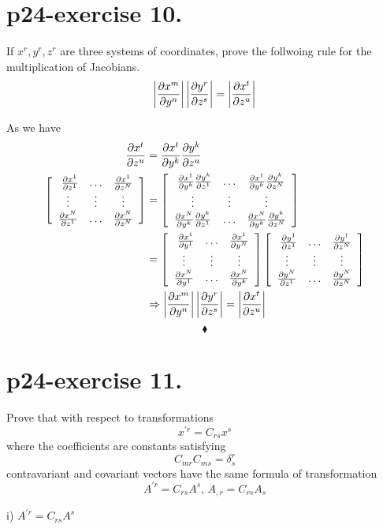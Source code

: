 \section{p24-exercise 10.}
\begin{tcolorbox}
If $x^r, y^r, z^r$ are three systems of coordinates, prove the follwoing rule for the multiplication of Jacobians.
$$\left|\pdv{x^m}{y^n}\right|\left|\pdv{y^r}{z^s}\right| = \left|\pdv{x^t}{z^u}\right|$$
\end{tcolorbox}
 As we have  
\begin{align}
\pdv{x^t}{z^u} &=\pdv{x^t}{y^k} \pdv{y^k}{z^u}\\
 \left[ { \begin{array}{ccc}
   \ \pdv{x^1}{z^1} & \dots & \pdv{x^1}{z^N}\\
   \vdots & \vdots & \vdots\\
    \pdv{x^N}{z^1} & \dots & \pdv{x^N}{z^N}\\
  \end{array}} \right] &= \left[ { \begin{array}{ccc}
   \ \pdv{x^1}{y^k}\pdv{y^k}{z^1} & \dots & \pdv{x^1}{y^k}\pdv{y^k}{z^N}\\
   \vdots & \vdots & \vdots\\
    \pdv{x^N}{y^k}\pdv{y^k}{z^1}& \dots & \pdv{x^N}{y^k}\pdv{y^k}{z^N}\\
  \end{array}} \right]\\
  &= \left[ { \begin{array}{ccc}
   \ \pdv{x^1}{y^1}& \dots & \pdv{x^1}{y^N}\\
   \vdots & \vdots & \vdots\\
    \pdv{x^N}{y^1}& \dots & \pdv{x^N}{y^k}\\
  \end{array}} \right]\left[ { \begin{array}{ccc}
   \ \pdv{y^1}{z^1} & \dots & \pdv{y^1}{z^N}\\
   \vdots & \vdots & \vdots\\
    \pdv{y^N}{z^1}& \dots & \pdv{y^N}{z^N}\\
  \end{array}} \right]\\
  \ & \Rightarrow \left|\pdv{x^m}{y^n}\right|\left|\pdv{y^r}{z^s}\right| = \left|\pdv{x^t}{z^u}\right|
  \end{align}
$$\blacklozenge$$
\pagebreak[4]


\section{p24-exercise 11.}
\begin{tcolorbox}
Prove that with respect to transformations $$ x^{'r} = C_{rs}x^s$$ where the coefficients are constants satisfying $$C_{mr}C_{ms} = \delta^r_s$$ contravariant and covariant vectors have the same formula of transformation $$ A^{'r} = C_{rs}A^{s} \text{, } A_{,r} = C_{rs}A_{s} $$
\end{tcolorbox}
 i) $ A^{'r} = C_{rs}A^{s}$\\
 
